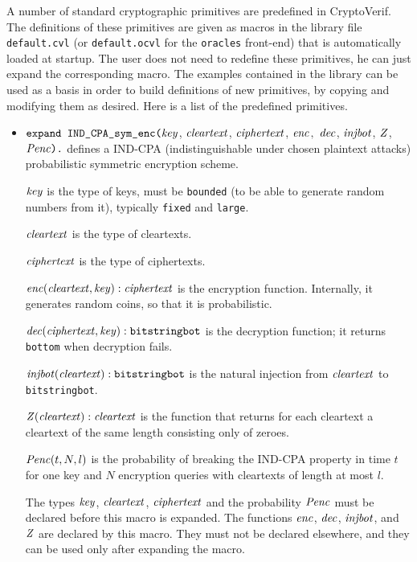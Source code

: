 \documentclass{article}
\begin{document}
A number of standard cryptographic primitives are predefined in
CryptoVerif.  The definitions of these primitives are given as macros
in the library file \texttt{default.cvl} (or \texttt{default.ocvl} for
the \texttt{oracles} front-end) that is automatically loaded at
startup.  The user does not need to redefine these primitives, he can
just expand the corresponding macro. The examples contained in the library
can be used as a basis in order to build definitions of new primitives, by copying
and modifying them as desired. Here is a list of the predefined primitives.
\begin{itemize}

\item $\texttt{expand IND\_CPA\_sym\_enc(}\mathit{key}$,
$  \mathit{cleartext}$, $\mathit{ciphertext}$, $\mathit{enc}$$,
$  $\mathit{dec}$, $\mathit{injbot}$, $\mathit{Z}$, $\mathit{Penc}\texttt{).}$ defines a
  IND-CPA (indistinguishable under chosen plaintext attacks)
  probabilistic symmetric encryption scheme.

   $\mathit{key}$ is the type of keys, must be \texttt{bounded} (to be able to generate random numbers from it), typically \texttt{fixed} and \texttt{large}.

   $\mathit{cleartext}$ is the type of cleartexts.

   $\mathit{ciphertext}$ is the type of ciphertexts.

   $\mathit{enc}(\mathit{cleartext}, \mathit{key}): \mathit{ciphertext}$ is the encryption function. Internally, it generates random coins, so that it is probabilistic.

   $\mathit{dec}(\mathit{ciphertext}, \mathit{key}): \texttt{bitstringbot}$ is the
  decryption function; it returns \texttt{bottom} when decryption
  fails.

   $\mathit{injbot}(\mathit{cleartext}): \texttt{bitstringbot}$ is the natural
  injection from $\mathit{cleartext}$ to \texttt{bitstringbot}.

   $\mathit{Z}(\mathit{cleartext}): \mathit{cleartext}$ is the function that
  returns for each cleartext a cleartext of the same length consisting
  only of zeroes.

  $\mathit{Penc}(t, N, l)$ is the probability of breaking the IND-CPA
  property in time $t$ for one key and $N$ encryption queries with
  cleartexts of length at most $l$.

   The types $\mathit{key}$, $\mathit{cleartext}$,
   $\mathit{ciphertext}$ and the probability $\mathit{Penc}$ must
   be declared before this macro is expanded. The functions
   $\mathit{enc}$, $\mathit{dec}$, $\mathit{injbot}$, and $\mathit{Z}$ are declared by this
   macro. They must not be declared elsewhere, and they can be used
   only after expanding the macro.


\end{itemize}
\end{document}
